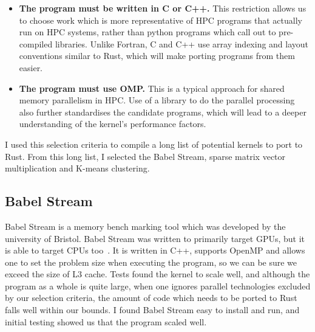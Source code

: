 \begin{itemize}
  \item \textbf{The program must be written in C or C++.} This restriction allows us to choose work which is more representative of HPC programs that actually run on HPC systems, rather than python programs which call out to pre-compiled libraries. Unlike Fortran, C and C++ use array indexing and layout conventions similar to Rust, which will make porting programs from them easier.

  \item \textbf{The program must use OMP.} This is a typical approach for shared memory parallelism in HPC. Use of a library to do the parallel processing also further standardises the candidate programs, which will lead to a deeper understanding of the kernel's performance factors.
\end{itemize}

I used this selection criteria to compile a long list of potential kernels to port to Rust. From this long list, I selected the Babel Stream, sparse matrix vector multiplication and K-means clustering.

\subsection{Babel Stream}

Babel Stream is a memory bench marking tool which was developed by the university of Bristol. Babel Stream was written to primarily target GPUs, but it is able to target CPUs too~\cite{BabelStream}.  It is written in C++, supports OpenMP and allows one to set the problem size when executing the program, so we can be sure we exceed the size of L3 cache. Tests found the kernel to scale well, and although the program as a whole is quite large, when one ignores parallel technologies excluded by our selection criteria, the amount of code which needs to be ported to Rust falls well within our bounds. I found Babel Stream easy to install and run, and initial testing showed us that the program scaled well.

